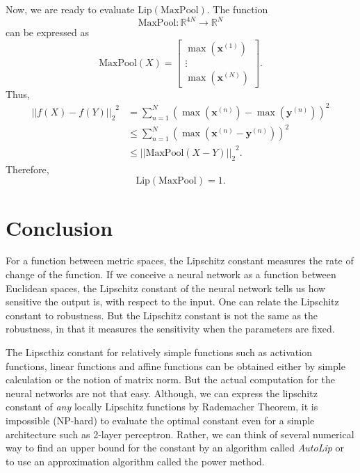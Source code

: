 \documentclass[12pt]{report}
\numberwithin{figure}{chapter}
\theoremstyle{plain}
\theoremstyle{definition}
\theoremstyle{corollary}
\theoremstyle{definition}
\theoremstyle{plain}
\theoremstyle{definition}
\theoremstyle{plain}
\newcommand\bx{\ensuremath{\boldsymbol x}}
\newcommand\by{\ensuremath{\boldsymbol y}}
\newcommand\lip{\ensuremath{\text{Lip}}}
\begin{document}
Now, we are ready to evaluate \(\lip(\text{MaxPool})\).
The function \[\text{MaxPool}:\mathbb R^{4N}\to\mathbb R^N\] can be expressed as
\[\text{MaxPool}(X)=\begin{bmatrix}\max \left(\bx^{(1)}\right)\\\vdots\\\max \left(\bx^{(N)}\right)\end{bmatrix}.\]
Thus,
\begin{align*}
{\left|\left|f(X)-f(Y)\right|\right|_2}^2
&=\sum_{n=1}^N\left(\max\left(\bx^{(n)}\right)-\max\left(\by^{(n)}\right)\right)^2\\
&\le\sum_{n=1}^N\left(\max\left(\bx^{(n)}-\by^{(n)}\right)\right)^2\\
&{\le\left|\left|\text{MaxPool}(X-Y)\right|\right|_2}^2.
\end{align*}
Therefore,
\[\lip(\text{MaxPool})=1.\]

\chapter{Conclusion}
For a function between metric spaces, the Lipschitz constant measures the rate of change of the function.
If we conceive a neural network as a function between Euclidean spaces, the Lipschitz constant of the neural network tells us how sensitive the output is, with respect to the input.
One can relate the Lipschitz constant to robustness.
But the Lipschitz constant is not the same as the robustness, in that it measures the sensitivity when the parameters are fixed.

The Lipscthiz constant for relatively simple functions such as activation functions, linear functions and affine functions can be obtained either by simple calculation or the notion of matrix norm.
But the actual computation for the neural networks are not that easy.
Although, we can express the lipschitz constant of \emph{any} locally Lipschitz functions by Rademacher Theorem, it is impossible (NP-hard) to evaluate the optimal constant even for a simple architecture such as 2-layer perceptron.
Rather, we can think of several numerical way to find an upper bound for the constant by an algorithm called \emph{AutoLip} or to use an approximation algorithm called the power method.

\newpage
\end{document}

